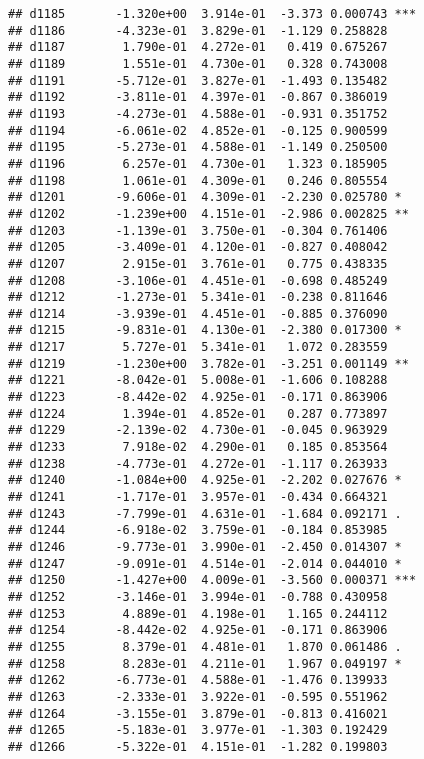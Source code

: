 \documentclass[
]{article}
\begin{document}
\begin{verbatim}
## d1185       -1.320e+00  3.914e-01  -3.373 0.000743 ***
## d1186       -4.323e-01  3.829e-01  -1.129 0.258828    
## d1187        1.790e-01  4.272e-01   0.419 0.675267    
## d1189        1.551e-01  4.730e-01   0.328 0.743008    
## d1191       -5.712e-01  3.827e-01  -1.493 0.135482    
## d1192       -3.811e-01  4.397e-01  -0.867 0.386019    
## d1193       -4.273e-01  4.588e-01  -0.931 0.351752    
## d1194       -6.061e-02  4.852e-01  -0.125 0.900599    
## d1195       -5.273e-01  4.588e-01  -1.149 0.250500    
## d1196        6.257e-01  4.730e-01   1.323 0.185905    
## d1198        1.061e-01  4.309e-01   0.246 0.805554    
## d1201       -9.606e-01  4.309e-01  -2.230 0.025780 *  
## d1202       -1.239e+00  4.151e-01  -2.986 0.002825 ** 
## d1203       -1.139e-01  3.750e-01  -0.304 0.761406    
## d1205       -3.409e-01  4.120e-01  -0.827 0.408042    
## d1207        2.915e-01  3.761e-01   0.775 0.438335    
## d1208       -3.106e-01  4.451e-01  -0.698 0.485249    
## d1212       -1.273e-01  5.341e-01  -0.238 0.811646    
## d1214       -3.939e-01  4.451e-01  -0.885 0.376090    
## d1215       -9.831e-01  4.130e-01  -2.380 0.017300 *  
## d1217        5.727e-01  5.341e-01   1.072 0.283559    
## d1219       -1.230e+00  3.782e-01  -3.251 0.001149 ** 
## d1221       -8.042e-01  5.008e-01  -1.606 0.108288    
## d1223       -8.442e-02  4.925e-01  -0.171 0.863906    
## d1224        1.394e-01  4.852e-01   0.287 0.773897    
## d1229       -2.139e-02  4.730e-01  -0.045 0.963929    
## d1233        7.918e-02  4.290e-01   0.185 0.853564    
## d1238       -4.773e-01  4.272e-01  -1.117 0.263933    
## d1240       -1.084e+00  4.925e-01  -2.202 0.027676 *  
## d1241       -1.717e-01  3.957e-01  -0.434 0.664321    
## d1243       -7.799e-01  4.631e-01  -1.684 0.092171 .  
## d1244       -6.918e-02  3.759e-01  -0.184 0.853985    
## d1246       -9.773e-01  3.990e-01  -2.450 0.014307 *  
## d1247       -9.091e-01  4.514e-01  -2.014 0.044010 *  
## d1250       -1.427e+00  4.009e-01  -3.560 0.000371 ***
## d1252       -3.146e-01  3.994e-01  -0.788 0.430958    
## d1253        4.889e-01  4.198e-01   1.165 0.244112    
## d1254       -8.442e-02  4.925e-01  -0.171 0.863906    
## d1255        8.379e-01  4.481e-01   1.870 0.061486 .  
## d1258        8.283e-01  4.211e-01   1.967 0.049197 *  
## d1262       -6.773e-01  4.588e-01  -1.476 0.139933    
## d1263       -2.333e-01  3.922e-01  -0.595 0.551962    
## d1264       -3.155e-01  3.879e-01  -0.813 0.416021    
## d1265       -5.183e-01  3.977e-01  -1.303 0.192429    
## d1266       -5.322e-01  4.151e-01  -1.282 0.199803    

\end{verbatim}
\end{document}

